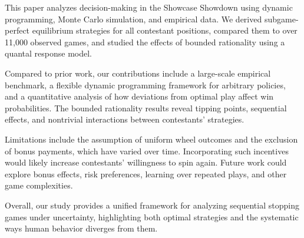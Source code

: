 \documentclass[titlepage,12pt]{article}
\begin{document}
This paper analyzes decision-making in the Showcase Showdown using dynamic programming, Monte Carlo simulation, and empirical data. We derived subgame-perfect equilibrium strategies for all contestant positions, compared them to over 11{,}000 observed games, and studied the effects of bounded rationality using a quantal response model.  

Compared to prior work, our contributions include a large-scale empirical benchmark, a flexible dynamic programming framework for arbitrary policies, and a quantitative analysis of how deviations from optimal play affect win probabilities. The bounded rationality results reveal tipping points, sequential effects, and nontrivial interactions between contestants’ strategies.  

Limitations include the assumption of uniform wheel outcomes and the exclusion of bonus payments, which have varied over time. Incorporating such incentives would likely increase contestants’ willingness to spin again. Future work could explore bonus effects, risk preferences, learning over repeated plays, and other game complexities.  

Overall, our study provides a unified framework for analyzing sequential stopping games under uncertainty, highlighting both optimal strategies and the systematic ways human behavior diverges from them.


\printbibliography
\end{document}
